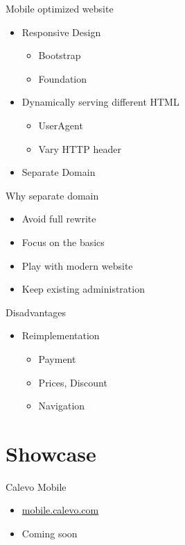 \begin{frame}{Mobile optimized website}
\begin{itemize}
\item Responsive Design
\begin{itemize}
  \item Bootstrap
  \item Foundation
\end{itemize}
\item Dynamically serving different HTML
\begin{itemize}
  \item UserAgent
  \item Vary HTTP header
\end{itemize}
\item Separate Domain
\end{itemize}
\end{frame}

\begin{frame}{Why separate domain}
\begin{itemize}
\item Avoid full rewrite 
\item Focus on the basics
\item Play with modern website
\item Keep existing administration
\end{itemize}
\end{frame}

\begin{frame}{Disadvantages}
\begin{itemize}
\item Reimplementation
\begin{itemize}
\item Payment
\item Prices, Discount
\item Navigation
\end{itemize}
\end{itemize}
\end{frame}

\section{Showcase}

\begin{frame}{Calevo Mobile}
\begin{itemize}
\item \url{mobile.calevo.com}
\item Coming soon
\end{itemize}
\end{frame}

